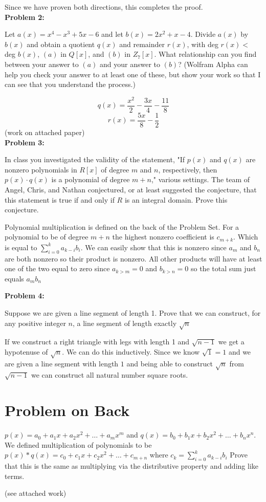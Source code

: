 \documentclass[a4paper, 11pt]{article}
\begin{document}
    Since we have proven both directions, this completes the proof.\\
\newpage
\noindent\textbf{Problem 2:}
    
    Let $a(x) = x^4 - x^3 +5x-6$ and let $b(x) = 2x^2 +x-4.$ Divide $a(x)$ by $b(x)$ and obtain a quotient $q(x)$ and remainder $r(x)$, with deg $r(x) <$ deg $b(x)$, $(a)$ in $Q[x]$, and $(b)$ in $Z_7[x]$. What relationship can you find between your answer to $(a)$ and your answer to $(b)$? (Wolfram Alpha can help you check your answer to at least one of these, but show your work so that I can see that you understand the process.)
    
    $$q(x) = \frac{x^2}{2}- \frac{3x}{4}-\frac{11}{8}$$
    $$r(x) = \frac{5x}{8} - \frac{1}{2}$$
    (work on attached paper)\\
    
\noindent\textbf{Problem 3:}
    
    In class you investigated the validity of the statement, "If $p(x)$ and $q(x)$ are nonzero polynomials in $R[x]$ of degree $m$ and $n$, respectively, then $p(x) · q(x)$ is a polynomial of degree $m + n$,"  various settings. The team of Angel, Chris, and Nathan conjectured, or at least suggested the conjecture, that this statement is true if and only if $R$ is an integral domain. Prove this conjecture.
    
    Polynomial multiplication is defined on the back of the Problem Set. For a polynomial to be of degree $m+n$ the highest nonzero coefficient is $c_{m+k}$. Which is equal to $\sum\limits_{i=0}^{k} a_{k-i}b_i$. We can easily show that this is nonzero since $a_m$ and $b_n$ are both nonzero so their product is nonzero. All other products will have at least one of the two equal to zero since $a_{k>m}=0$ and $b_{k>n}=0$ so the total sum just equals $a_mb_n$
    
\noindent\textbf{Problem 4:}
    
    Suppose we are given a line segment of length 1. Prove that we can construct, for any positive integer $n$, a line segment of length exactly $\sqrt{n}$ 
    
    If we construct a right triangle with legs with length 1 and $\sqrt{n-1}$ we get a hypotenuse of $\sqrt{n}$. We can do this inductively. Since we know $\sqrt{1}=1$ and we are given a line segment with length $1$ and being able to construct $\sqrt{n}$ from $\sqrt{n-1}$ we can construct all natural number square roots.
    
\section*{Problem on Back}

    $p(x) = a_0 + a_1x + a_2x^2 + \dots + a_mx^m$ and $q(x) = b_0 + b_1x + b_2x^2 +\dots +b_nx^n$. We defined multiplication of polynomials to be $p(x) * q(x) = c_0 + c_1x + c_2x^2 + \dots + c_{m+n}$ where $c_k = \sum\limits_{i=0}^{k} a_{k-i}b_i$ 
    Prove that this is the same as multiplying via the distributive property and adding like terms.
    
    (see attached work)
    
\end{document}
